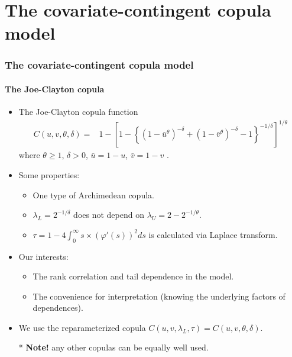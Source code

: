 \documentclass{beamer}
\begin{document}
\section{The covariate-contingent copula model}
\begin{frame}
  \frametitle{The covariate-contingent copula model}
  \framesubtitle{The Joe-Clayton copula}
  \begin{itemize}
  \item The Joe-Clayton copula function
    \[
    \begin{split}
      C(u,v,\theta,\delta)=&1-\left[1-\left\{\left(1-\bar u ^{\theta }\right)^{-\delta
          }+\left(1-\bar v ^{\theta }\right)^{-\delta }-1\right\}^{-1/\delta
        }\right]^{1/\theta }
    \end{split}
    \]
    where $\theta \geq 1$, $\delta > 0$, $\bar u = 1-u$, $\bar v = 1-v$ .

  \item Some properties:
    \begin{itemize}
    \item One type of Archimedean copula.
    \item $\lambda_L=2^{-1/\delta}$ does not depend on $\lambda_U=2-2^{-1/\theta}$.
    \item  $\tau=1- 4\int _0^{\infty} s\times(\varphi'(s))^2ds$ is calculated via Laplace transform.
    \end{itemize}

  \item Our interests:
    \begin{itemize}
    \item The rank correlation and tail dependence in the model.
    \item The convenience for interpretation (knowing the underlying factors of
      dependences).
    \end{itemize}

  \item We use the reparameterized copula    $C(u,v,\lambda_L,
    \tau)=C(u,v,\theta,\delta)$.
  \item [*] \textbf{Note!} any other copulas can be equally well used.
  \end{itemize}

\end{frame}
\end{document}
